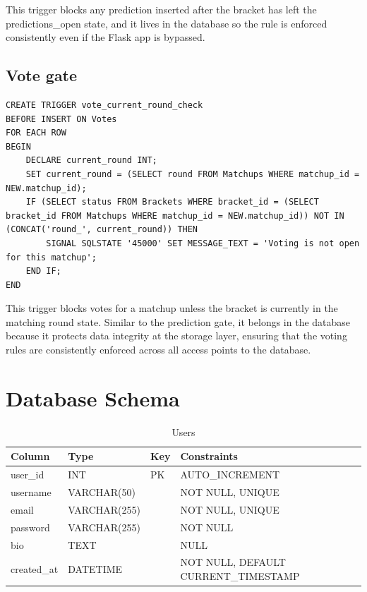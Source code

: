 \documentclass[11pt]{article}
\begin{document}
This trigger blocks any prediction inserted after the bracket has left the predictions\_open state, and it lives in the database so the rule is enforced consistently even if the Flask app is bypassed.

\subsection*{Vote gate}
\begin{verbatim}
CREATE TRIGGER vote_current_round_check
BEFORE INSERT ON Votes
FOR EACH ROW
BEGIN
    DECLARE current_round INT;
    SET current_round = (SELECT round FROM Matchups WHERE matchup_id = NEW.matchup_id);
    IF (SELECT status FROM Brackets WHERE bracket_id = (SELECT bracket_id FROM Matchups WHERE matchup_id = NEW.matchup_id)) NOT IN (CONCAT('round_', current_round)) THEN
        SIGNAL SQLSTATE '45000' SET MESSAGE_TEXT = 'Voting is not open for this matchup';
    END IF;
END
\end{verbatim}

This trigger blocks votes for a matchup unless the bracket is currently in the matching round state. Similar to the prediction gate, it belongs in the database because it protects data integrity at the storage layer, 
ensuring that the voting rules are consistently enforced across all access points to the database.

\section{Database Schema}

\begin{table}[ht]
\centering
\caption{Users}
\begin{tabular}{|p{3.2cm}|p{3.8cm}|p{1.2cm}|p{5.3cm}|}
\hline
Column & Type & Key & Constraints \\ \hline
user\_id & INT & PK & AUTO\_INCREMENT \\ \hline
username & VARCHAR(50) &  & NOT NULL, UNIQUE \\ \hline
email & VARCHAR(255) &  & NOT NULL, UNIQUE \\ \hline
password & VARCHAR(255) &  & NOT NULL \\ \hline
bio & TEXT &  & NULL \\ \hline
created\_at & DATETIME &  & NOT NULL, DEFAULT CURRENT\_TIMESTAMP \\ \hline
\end{tabular}
\end{table}
\end{document}
